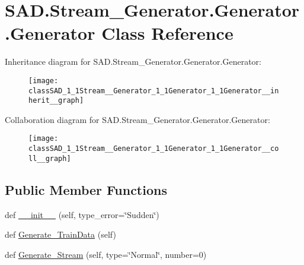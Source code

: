 \hypertarget{classSAD_1_1Stream__Generator_1_1Generator_1_1Generator}{}\section{S\+A\+D.\+Stream\+\_\+\+Generator.\+Generator.\+Generator Class Reference}
\label{classSAD_1_1Stream__Generator_1_1Generator_1_1Generator}


Inheritance diagram for S\+A\+D.\+Stream\+\_\+\+Generator.\+Generator.\+Generator\+:\nopagebreak
\begin{figure}[H]
\begin{center}
\leavevmode
\texttt{[image: classSAD\_1\_1Stream\_\_Generator\_1\_1Generator\_1\_1Generator\_\_inherit\_\_graph]}
\end{center}
\end{figure}


Collaboration diagram for S\+A\+D.\+Stream\+\_\+\+Generator.\+Generator.\+Generator\+:\nopagebreak
\begin{figure}[H]
\begin{center}
\leavevmode
\texttt{[image: classSAD\_1\_1Stream\_\_Generator\_1\_1Generator\_1\_1Generator\_\_coll\_\_graph]}
\end{center}
\end{figure}
\subsection*{Public Member Functions}
\begin{DoxyCompactItemize}
\item 
def \hyperlink{classSAD_1_1Stream__Generator_1_1Generator_1_1Generator_a5377eee3255f592c8784613ec36d9b7b}{\+\_\+\+\_\+init\+\_\+\+\_\+} (self, type\+\_\+error=\char`\"{}Sudden\char`\"{})
\item 
def \hyperlink{classSAD_1_1Stream__Generator_1_1Generator_1_1Generator_a7f0553ca2a50b0f9e840b0348a3b47ee}{Generate\+\_\+\+Train\+Data} (self)
\item 
def \hyperlink{classSAD_1_1Stream__Generator_1_1Generator_1_1Generator_a6baa6039a6203f9be7b10ddf4ec44775}{Generate\+\_\+\+Stream} (self, type=\char`\"{}Normal\char`\"{}, number=0)
\end{DoxyCompactItemize}
